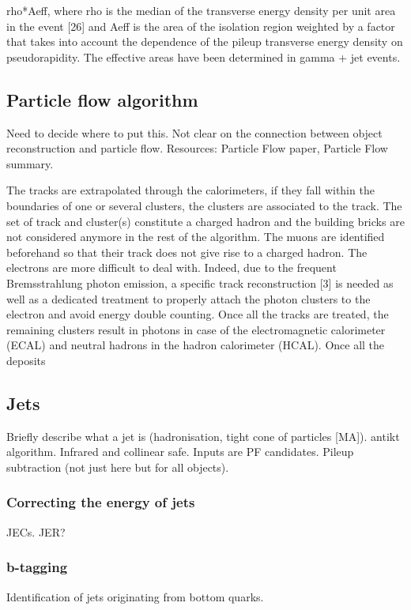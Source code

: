 rho*Aeff, where rho is the median of the transverse energy density per unit 
area in 
the event [26] and Aeff is the area of the isolation region weighted by a 
factor that takes into account the dependence of the pileup transverse energy 
density on pseudorapidity. The effective areas have been determined in gamma + 
jet events.

\subsection{Particle flow algorithm}
Need to decide where to put this. Not clear on the connection between object 
reconstruction and particle flow.
Resources: Particle Flow paper, Particle Flow summary.

The tracks are extrapolated through the calorimeters, if they fall within the 
boundaries of one or several clusters, the clusters are associated to the 
track. The set of track and cluster(s) constitute a charged hadron and the 
building bricks are not considered anymore in the rest of the algorithm. The 
muons are identified beforehand so that their track does not give rise to a 
charged hadron. The electrons are more difficult to deal with. Indeed, due to 
the frequent Bremsstrahlung photon emission, a specific track reconstruction [3]
is needed as well as a dedicated treatment to properly attach the photon 
clusters to the electron and avoid energy double counting. Once all the tracks 
are treated, the remaining clusters result in photons in case of the 
electromagnetic calorimeter (ECAL) and neutral hadrons in the hadron 
calorimeter (HCAL). Once all the deposits

\subsection{Jets}

Briefly describe what a jet is (hadronisation, tight cone of particles [MA]).
antikt algorithm. Infrared and collinear safe.
Inputs are PF candidates. Pileup subtraction (not just here but for all 
objects).

\subsubsection{Correcting the energy of jets}
\label{sec:detector-jecs}
JECs. JER?

\subsubsection{b-tagging}
\label{sec:detector-btagging}
Identification of jets originating from bottom quarks.


